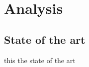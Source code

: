 \chapter{Analysis}
           
    \section{State of the art}\label{sec:SOTA}
		this the state of the art            